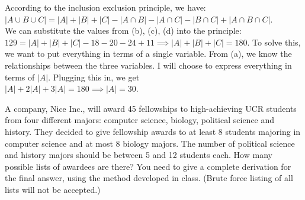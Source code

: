 \documentclass[11pt]{article}
\begin{document}

\begin{solution}
	According to the inclusion exclusion principle, we have: \\ $|A \cup B \cup C| = |A| + |B| + |C| - |A \cap B| - |A \cap C| - |B \cap C| + |A \cap B \cap C|$.
   \\
   We can substitute the values from (b), (c), (d) into the principle:
   \\
   $129 = |A| + |B| + |C| - 18 - 20 - 24 + 11 \implies |A| + |B| + |C| = 180$. To solve this, we want to put everything in terms of a single variable. From (a), we know the relationships between the three variables. I will choose to express everything in terms of $|A|$. Plugging this in, we get 
   \\ 
   $|A| +  2|A| + 3|A| = 180 \implies |A| = 30$. 

\end{solution}

\newpage

\begin{problem}
	A company, Nice Inc., will award 45 fellowships to high-achieving UCR students from four different majors: computer science, biology, political science and history. They decided to give fellowship awards to at least 8 students majoring in computer science and at most 8 biology majors. The number of political science and history majors should be between 5 and 12 students each. How many possible lists of awardees are there? You need to give a complete derivation for the final answer, using the method developed in class. 
	(Brute force listing of all lists will not be accepted.)
	
\end{problem}
	
\end{document}
